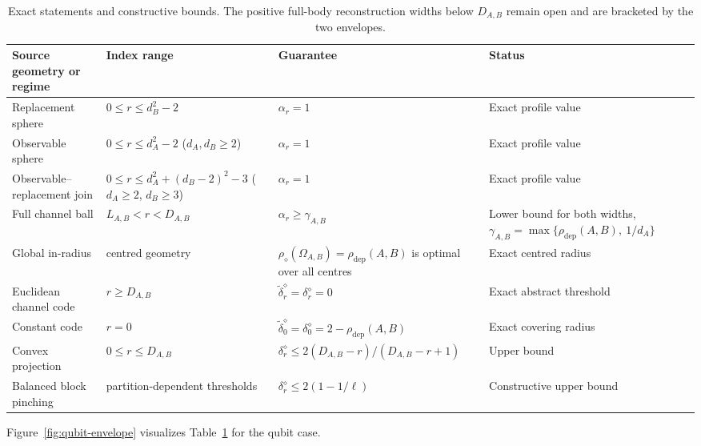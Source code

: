\documentclass[11pt,a4paper]{article}
\theoremstyle{definition}
\theoremstyle{plain}
\theoremstyle{remark}
\newcommand{\rhodep}{\rho_{\mathrm{dep}}}
\begin{document}
\begin{table}[t]
\centering
\small
\setlength{\tabcolsep}{4pt}
\begin{tabular}{p{3.8cm}p{3.2cm}p{2.8cm}p{4.1cm}}
\hline
Source geometry or regime & Index range & Guarantee & Status\\
\hline
Replacement sphere
& $0\leq r\leq d_B^2-2$
& $\alpha_r=1$ & Exact profile value\\
Observable sphere
& $0\le r\le d_A^2-2$ ($d_A,d_B\ge2$)
& $\alpha_r=1$ & Exact profile value\\
Observable--replacement join
& $0\le r\le d_A^2+(d_B-2)^2-3$ ($d_A\ge2$, $d_B\ge3$)
& $\alpha_r=1$ & Exact profile value\\
Full channel ball
& $L_{A,B}<r<D_{A,B}$
& $\alpha_r\ge\gamma_{A,B}$ & Lower bound for both widths, $\gamma_{A,B}=\max\{\rhodep(A,B),\ 1/d_A\}$\\
Global in-radius
& centred geometry
& $\rho_\diamond(\Omega_{A,B})=\rhodep(A,B)$ is optimal over all centres & Exact centred radius\\
Euclidean channel code
& $r\geq D_{A,B}$
& $\widetilde\delta_r^\diamond=\delta_r^\diamond=0$
& Exact abstract threshold\\
Constant code
& $r=0$
& $\widetilde\delta_0^\diamond=\delta_0^\diamond=2-\rhodep(A,B)$
& Exact covering radius\\
Convex projection
& $0\leq r\leq D_{A,B}$
& $\delta_r^\diamond\leq2(D_{A,B}-r)/(D_{A,B}-r+1)$
& Upper bound\\
Balanced block pinching
& partition-dependent thresholds
& $\delta_r^\diamond\leq2(1-1/\ell)$ & Constructive upper bound\\
\hline
\end{tabular}
\caption{Exact statements and constructive bounds. The positive full-body
reconstruction widths below $D_{A,B}$ remain open and are bracketed by the
two envelopes.}
\label{tab:channel-scales}
\end{table}

Figure~\ref{fig:qubit-envelope} visualizes Table~\ref{tab:channel-scales} for the qubit case.
\end{document}
